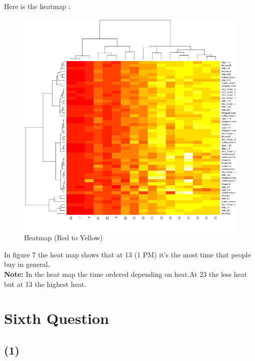 \documentclass{article}
\begin{document}
Here is the heatmap :
\begin{figure}[H]
\begin{center}
	\includegraphics[scale=0.7]{heatmap2.png}
\end{center}
\caption{Heatmap (Red to Yellow)}
\end{figure}
\begin{flushleft}

In figure 7 the heat map shows that at 13 (1 PM) it's the most time that people buy in general.\\
\textbf{Note:} In the heat map the time ordered depending on heat.At 23 the less heat but at 13 the highest heat.
\end{flushleft}
		{\centering \section*{Sixth Question}}
		{\centering \subsection*{(1)}}
\end{document}
